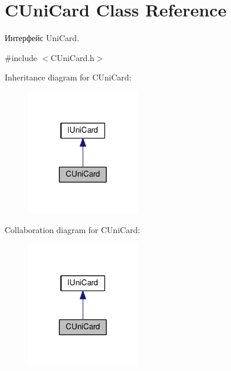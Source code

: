 \hypertarget{classCUniCard}{}\section{C\+Uni\+Card Class Reference}
\label{classCUniCard}


Интерфейс Uni\+Card.  




{\ttfamily \#include $<$C\+Uni\+Card.\+h$>$}



Inheritance diagram for C\+Uni\+Card\+:\nopagebreak
\begin{figure}[H]
\begin{center}
\leavevmode
\includegraphics[width=140pt]{classCUniCard__inherit__graph}
\end{center}
\end{figure}


Collaboration diagram for C\+Uni\+Card\+:\nopagebreak
\begin{figure}[H]
\begin{center}
\leavevmode
\includegraphics[width=140pt]{classCUniCard__coll__graph}
\end{center}
\end{figure}
